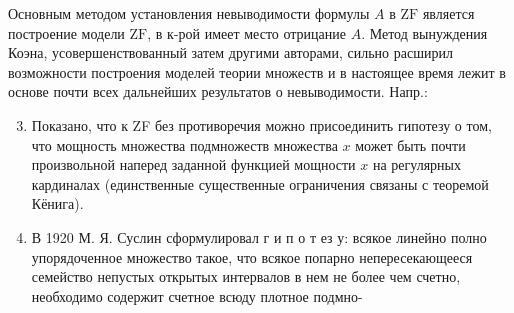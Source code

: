 \documentclass[10pt]{article}
\begin{document}
Основным методом установления невыводимости формулы $A$ в $\mathrm{ZF}$ является построение модели $\mathrm{ZF}$, в к-рой имеет место отрицание $A$. Метод вынуждения Коэна, усовершенствованный затем другими авторами, сильно расширил возможности построения моделей теории множеств и в настоящее время лежит в основе почти всех дальнейших результатов о невыводимости. Напр.:



\begin{enumerate}

  \setcounter{enumi}{2}

  \item Показано, что к ZF без противоречия можно присоединить гипотезу о том, что мощность множества подмножеств множества $x$ может быть почти произвольной наперед заданной функцией мощности $x$ на регулярных кардиналах (единственные существенные ограничения связаны с теоремой Кёнига).



  \item В 1920 М. Я. Суслин сформулировал г и п о т ез у: всякое линейно полно упорядоченное множество такое, что всякое попарно непересекающееся семейство непустых открытых интервалов в нем не более чем счетно, необходимо содержит счетное всюду плотное подмно-



\end{enumerate}
\end{document}
